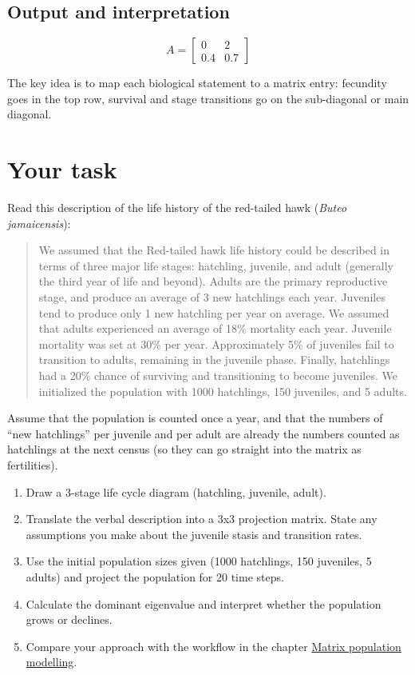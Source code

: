 \documentclass[
  a4paper]{book}
\providecommand{\tightlist}{%
  \setlength{\itemsep}{0pt}\setlength{\parskip}{0pt}}
\begin{document}
\subsection{Output and interpretation}\label{output-and-interpretation-7}

\[
A =
\begin{bmatrix}
0 & 2 \\
0.4 & 0.7
\end{bmatrix}
\]

The key idea is to map each biological statement to a matrix entry: fecundity goes in the top row, survival and stage transitions go on the sub-diagonal or main diagonal.

\section{Your task}\label{your-task-22}

Read this description of the life history of the red-tailed hawk (\emph{Buteo jamaicensis}):

\begin{quote}
We assumed that the Red-tailed hawk life history could be described in terms of three major life stages: hatchling, juvenile, and adult (generally the third year of life and beyond). Adults are the primary reproductive stage, and produce an average of 3 new hatchlings each year. Juveniles tend to produce only 1 new hatchling per year on average. We assumed that adults experienced an average of 18\% mortality each year. Juvenile mortality was set at 30\% per year. Approximately 5\% of juveniles fail to transition to adults, remaining in the juvenile phase. Finally, hatchlings had a 20\% chance of surviving and transitioning to become juveniles. We initialized the population with 1000 hatchlings, 150 juveniles, and 5 adults.
\end{quote}

Assume that the population is counted once a year, and that the numbers of ``new hatchlings'' per juvenile and per adult are already the numbers counted as hatchlings at the next census (so they can go straight into the matrix as fertilities).

\begin{enumerate}
\def\labelenumi{\arabic{enumi}.}
\tightlist
\item
  Draw a 3-stage life cycle diagram (hatchling, juvenile, adult).
\item
  Translate the verbal description into a 3x3 projection matrix. State any assumptions you make about the juvenile stasis and transition rates.
\item
  Use the initial population sizes given (1000 hatchlings, 150 juveniles, 5 adults) and project the population for 20 time steps.
\item
  Calculate the dominant eigenvalue and interpret whether the population grows or declines.
\item
  Compare your approach with the workflow in the chapter \hyperref[matrix-population-modelling]{Matrix population modelling}.
\end{enumerate}
\end{document}
